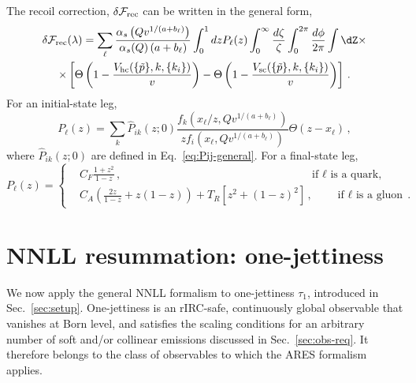 The recoil correction, $\delta\mathcal{F}_{\rm rec}$ can be written in the general form,
 \begin{multline}
   \label{eq:dFrec-ISR}
   \delta\mathcal{F}_{\rm rec}(\lambda)=\sum_\ell \frac{\alpha_s\left(Qv^{1/(a+b_\ell)}\right)}{\alpha_s(Q)\left(a+b_\ell\right)}\int_0^1 dz P_\ell(z) \int_0^{\infty}\frac{d\zeta}{\zeta}\int_0^{2\pi}\frac{d\phi}{2\pi}
 \int \dZ  \times\\ \times  \left[\Theta\left(1-\frac{V_{\mathrm{hc}}(\{\tilde{p}\},k,\{k_i\})}{v}\right) -\Theta\left(1-\frac{V_{\mathrm{sc}}(\{\tilde{p}\},k,\{k_i\})}{v}\right)\right]\,.
\end{multline}
For an initial-state leg,
\begin{equation}
  \label{eq:Pell-ISR}
  P_\ell(z)=\sum_k \hat P_{ik}(z;0) \frac{f_k(x_\ell/z,Qv^{1/(a+b_\ell)})}{z f_i(x_\ell,Qv^{1/(a+b_\ell)})} \Theta(z-x_\ell)\,,
\end{equation}
where $ \hat P_{ik}(z;0)$ are defined in Eq.~\eqref{eq:Pij-general}.
For a final-state leg, 
\begin{equation}
  \label{eq:Pell-FSR}
  P_\ell(z)=\left\{
    \begin{split}
      &C_F \frac{1+z^2}{1-z}\,,\qquad\qquad\qquad\qquad\qquad\qquad\qquad\qquad\quad\text{if $\ell$ is a quark,}\\
      &C_A\left(\frac{2z}{1-z}+z(1-z)\right)+T_R\left[z^2+(1-z)^2\right]\,,\qquad\text{if $\ell$ is a gluon}\,.
    \end{split}
  \right.
\end{equation}

\section{ NNLL resummation: one-jettiness}
\label{sec:one-jettiness}
We now apply the general NNLL formalism to one-jettiness $\tau_1$,
introduced in Sec.~\ref{sec:setup}. One-jettiness is an rIRC-safe,
continuously global observable that vanishes at Born level, and satisfies the scaling conditions for an arbitrary number of soft
and/or collinear emissions discussed in Sec.~\ref{sec:obs-req}. It
therefore belongs to the class of observables to which the
\textsc{ARES} formalism applies.

